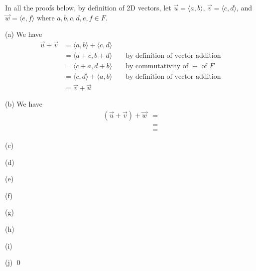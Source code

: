 \proof
In all the proofs below, by definition of 2D vectors, let
$\vec{u} = \langle a, b \rangle$,
$\vec{v} = \langle c, d \rangle$, and
$\vec{w} = \langle e, f \rangle$
where $a, b, c, d, e, f \in F$.

(a)
We have
\begin{align*}
  \vec{u} + \vec{v}
  &= \langle a, b \rangle + \langle c, d \rangle \\
  &= \langle a + c, b + d \rangle & & \text{ by definition of vector addition} \\
  &= \langle c + a, d + b\rangle & & \text{ by commutativity of $+$ of $F$} \\
  &= \langle c, d \rangle + \langle a, b \rangle & & \text{ by definition of vector addition} \\
  &= \vec{v} + \vec{u}  
\end{align*}

(b)
We have
\begin{align*}
  (\vec{u} + \vec{v}) + \vec{w}
  &=    \\
  &=    \\
  &=  
\end{align*}

(c)

(d)

(e)

(f)

(g)

(h)

(i)

(j)
\qed
